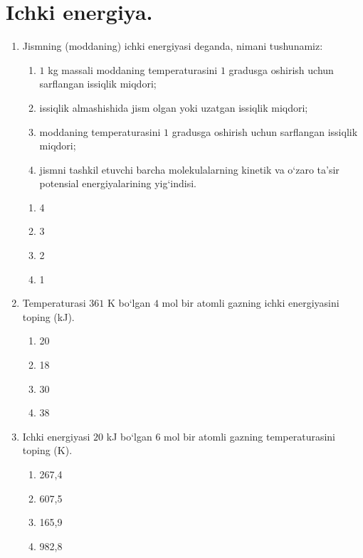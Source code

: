 \section{Ichki energiya.}



\begin{enumerate}

\item Jismning (moddaning) ichki energiyasi deganda, nimani tushunamiz:
\begin{enumerate}
\item $1$ kg massali moddaning temperaturasini $1$ gradusga oshirish uchun sarflangan issiqlik miqdori;
\item issiqlik almashishida jism olgan yoki uzatgan issiqlik miqdori;
\item moddaning temperaturasini $1$ gradusga oshirish uchun sarflangan issiqlik miqdori;
\item jismni tashkil etuvchi barcha molekulalarning kinetik va o‘zaro ta’sir potensial energiyalarining yig‘indisi.
\end{enumerate}
\begin{enumerate}[label=\Alph*)]
\item 4
\item 3
\item 2
\item 1

\end{enumerate}

\item Temperaturasi $361$ K bo‘lgan $4$ mol bir atomli gazning ichki energiyasini toping (kJ).
\begin{enumerate}[label=\Alph*)]
\item 20
\item 18
\item 30
\item 38

\end{enumerate}

\item Ichki energiyasi $20$ kJ bo‘lgan $6$ mol bir atomli gazning temperaturasini toping (K).
\begin{enumerate}[label=\Alph*)]
\item 267,4
\item 607,5
\item 165,9
\item 982,8

\end{enumerate}


\end{enumerate}
